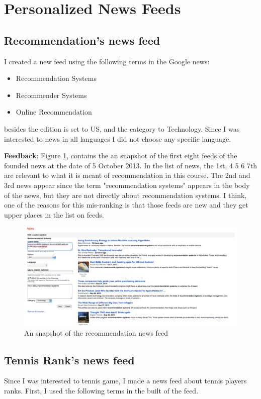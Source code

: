 \documentclass[10pt]{article}
\begin{document}
\section{Personalized News Feeds}
\subsection{Recommendation's news feed}
I created a new feed using the following terms in the Google news: 
\begin{itemize}
\item{Recommendation Systems}
\item{Recommender Systems}
\item{Online Recommendation}
\end{itemize}
besides the edition is set to US, and the category to Technology. Since I was interested to news in all languages I did not choose any specific language. 

\textbf{Feedback}: Figure \ref{recfeed}, contains the an snapshot of the first eight feeds  of the founded news at the date of 5 October 2013. In the list of news, the 1st, 4 5 6 7th are relevant to what it is meant of recommendation in this course. The 2nd and 3rd news appear since the term "recommendation systems" appears in the body of the news, but they are not directly about recommendation systems. I think, one of the reasons for this mis-ranking is that those feeds are new and they get upper places in the list on feeds.

\begin{figure}[h]
\begin{center}
    \centering 
    \includegraphics[scale=.52]{pic2.png}
    \caption{An snapshot of the recommendation news feed}
    \label{recfeed} 
\end{center}
\end{figure}




\subsection{Tennis Rank's news feed}
Since I was interested to tennis game, I made a news feed about tennis players ranks. First, I used the following terms in the built of the feed.
\end{document}
